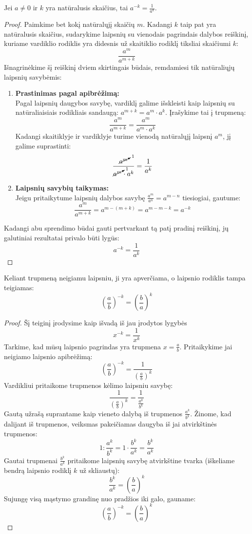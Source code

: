 \documentclass[11pt,a4paper]{scrartcl}
\begin{document}
\begin{proposition} 
Jei $a \neq 0$ ir $k$ yra natūralusis skaičius, tai $a^{-k} = \frac{1}{a^k}$.
\end{proposition}
\begin{proof}
Paimkime bet kokį natūralųjį skaičių $m$. Kadangi $k$ taip pat yra natūralusis skaičius, sudarykime laipsnių su vienodais pagrindais dalybos reiškinį, kuriame vardiklio rodiklis yra didesnis už skaitiklio rodiklį tiksliai skaičiumi $k$:
$$\frac{a^m}{a^{m+k}}$$
Išnagrinėkime šį reiškinį dviem skirtingais būdais, remdamiesi tik natūraliųjų laipsnių savybėmis:
\begin{enumerate}
    \item \textbf{Prastinimas pagal apibrėžimą:} \\
    Pagal laipsnių daugybos savybę, vardiklį galime išskleisti kaip laipsnių su natūraliaisiais rodikliais sandaugą: $a^{m+k} = a^m \cdot a^k$. Įrašykime tai į trupmeną:
    $$\frac{a^m}{a^{m+k}} = \frac{a^m}{a^m \cdot a^k}$$
    Kadangi skaitiklyje ir vardiklyje turime vienodą natūralųjį laipsnį $a^m$, jį galime suprastinti:
    $$\frac{\cancelto{1}{a^m}}{\cancelto{1}{a^m} \cdot a^k} = \frac{1}{a^k}$$
    \item \textbf{Laipsnių savybių taikymas:} \\
    Jeigu pritaikytume  laipsnių dalybos savybę $\frac{a^m}{a^n} = a^{m-n}$ tiesiogiai, gautume:
    $$\frac{a^m}{a^{m+k}} = a^{m - (m + k)} = a^{m - m - k} = a^{-k}$$
\end{enumerate}
Kadangi abu sprendimo būdai gauti pertvarkant tą patį pradinį reiškinį, jų galutiniai rezultatai privalo būti lygūs:
$$a^{-k} = \frac{1}{a^k}$$
\end{proof}
\begin{corollary}
Keliant trupmeną neigiamu laipsniu, ji yra apverčiama, o laipsnio rodiklis tampa teigiamas:
$$\left(\frac{a}{b}\right)^{-k} = \left(\frac{b}{a}\right)^k$$
\end{corollary}
\begin{proof}
Šį teiginį įrodysime kaip išvadą iš jau įrodytos lygybės 
$$x^{-k} = \frac{1}{x^k}$$
Tarkime, kad mūsų laipsnio pagrindas yra trupmena $x = \frac{a}{b}$. Pritaikykime jai neigiamo laipsnio apibrėžimą:
$$\left(\frac{a}{b}\right)^{-k} = \frac{1}{\left(\frac{a}{b}\right)^k}$$
Vardikliui pritaikome trupmenos kėlimo laipsniu savybę:
$$\frac{1}{\left(\frac{a}{b}\right)^k} = \frac{1}{\frac{a^k}{b^k}}$$
Gautą užrašą suprantame kaip vieneto dalybą iš trupmenos $\frac{a^k}{b^k}$. Žinome, kad dalijant iš trupmenos, veiksmas pakeičiamas daugyba iš jai atvirkštinės trupmenos:
$$1 : \frac{a^k}{b^k} = 1 \cdot \frac{b^k}{a^k} = \frac{b^k}{a^k}$$
Gautai trupmenai $\frac{b^k}{a^k}$ pritaikome laipsnių savybę atvirkštine tvarka (iškeliame bendrą laipsnio rodiklį $k$ už skliaustų):
$$\frac{b^k}{a^k} = \left(\frac{b}{a}\right)^k$$
Sujungę visą mąstymo grandinę nuo pradžios iki galo, gauname:
$$\left(\frac{a}{b}\right)^{-k} = \left(\frac{b}{a}\right)^k$$
\end{proof}
\end{document}
